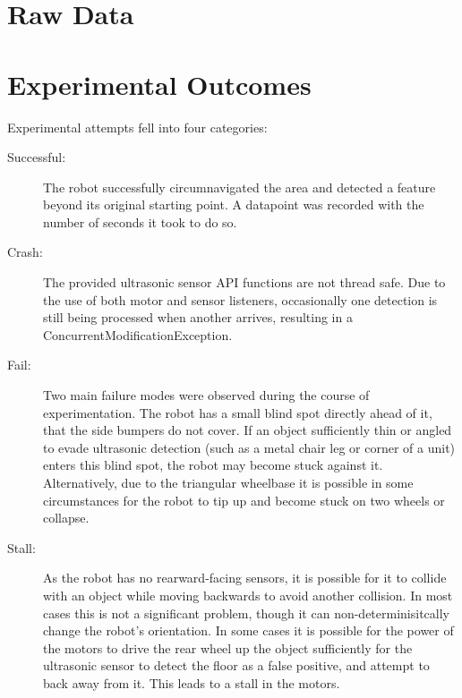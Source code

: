 \documentclass[a4paper,12pt]{article}
\begin{document}



\appendix
\section{Raw Data}\label{app:data}

\section{Experimental Outcomes}\label{app:fail}
Experimental attempts fell into four categories:
\begin{description}
	\item [Successful:] The robot successfully circumnavigated the area and detected a feature beyond its original starting point. A datapoint was recorded with the number of seconds it took to do so.
	\item [Crash:] The provided ultrasonic sensor API functions are not thread safe. Due to the use of both motor and sensor listeners, occasionally one detection is still being processed when another arrives, resulting in a ConcurrentModificationException.
	\item [Fail:] Two main failure modes were observed during the course of experimentation. The robot has a small blind spot directly ahead of it, that the side bumpers do not cover. If an object sufficiently thin or angled to evade ultrasonic detection (such as a metal chair leg or corner of a unit) enters this blind spot, the robot may become stuck against it. Alternatively, due to the triangular wheelbase it is possible in some circumstances for the robot to tip up and become stuck on two wheels or collapse.
	\item [Stall:] As the robot has no rearward-facing sensors, it is possible for it to collide with an object while moving backwards to avoid another collision. In most cases this is not a significant problem, though it can non-determinisitcally change the robot's orientation. In some cases it is possible for the power of the motors to drive the rear wheel up the object sufficiently for the ultrasonic sensor to detect the floor as a false positive, and attempt to back away from it. This leads to a stall in the motors.
\end{description}

\end{document}
